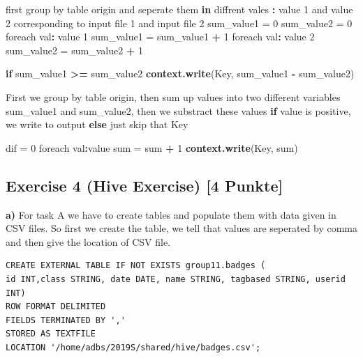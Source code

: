 \documentclass[]{article}
\newenvironment{Shaded}{\begin{snugshade}}{\end{snugshade}}
\newcommand{\ControlFlowTok}[1]{\textcolor[rgb]{0.13,0.29,0.53}{\textbf{#1}}}
\newcommand{\DecValTok}[1]{\textcolor[rgb]{0.00,0.00,0.81}{#1}}
\newcommand{\KeywordTok}[1]{\textcolor[rgb]{0.13,0.29,0.53}{\textbf{#1}}}
\newcommand{\NormalTok}[1]{#1}
\newcommand{\OperatorTok}[1]{\textcolor[rgb]{0.81,0.36,0.00}{\textbf{#1}}}
\newcommand{\StringTok}[1]{\textcolor[rgb]{0.31,0.60,0.02}{#1}}
\begin{document}
\begin{Shaded}
\begin{Highlighting}[]
\NormalTok{first group by table origin and seperate them }\ControlFlowTok{in}\NormalTok{ diffrent vales }\OperatorTok{:}\StringTok{ }\NormalTok{value }\DecValTok{1}\NormalTok{ and }
\NormalTok{value }\DecValTok{2}\NormalTok{ corresponding to input file }\DecValTok{1}\NormalTok{ and input file }\DecValTok{2}
\NormalTok{sum_value1 =}\StringTok{ }\DecValTok{0}
\NormalTok{sum_value2 =}\StringTok{ }\DecValTok{0}
\NormalTok{foreach val}\OperatorTok{:}\StringTok{ }\NormalTok{value }\DecValTok{1}
\NormalTok{    sum_value1 =}\StringTok{ }\NormalTok{sum_value1 }\OperatorTok{+}\StringTok{ }\DecValTok{1}
\NormalTok{foreach val}\OperatorTok{:}\StringTok{ }\NormalTok{value }\DecValTok{2}
\NormalTok{    sum_value2 =}\StringTok{ }\NormalTok{sum_value2 }\OperatorTok{+}\StringTok{ }\DecValTok{1}

\ControlFlowTok{if}\NormalTok{ sum_value1 }\OperatorTok{>=}\StringTok{ }\NormalTok{sum_value2}
    \KeywordTok{context.write}\NormalTok{(Key, sum_value1 }\OperatorTok{-}\StringTok{ }\NormalTok{sum_value2)}
    
\NormalTok{First we group by table origin, then sum up values into two different variables sum_value1}
\NormalTok{and sum_value2, then we substract these values }\ControlFlowTok{if}\NormalTok{ value is positive, }
\NormalTok{we write to output }\ControlFlowTok{else}\NormalTok{ just skip that Key}

\NormalTok{dif =}\StringTok{ }\DecValTok{0}
\NormalTok{foreach val}\OperatorTok{:}\NormalTok{value }
\NormalTok{    sum =}\StringTok{ }\NormalTok{sum }\OperatorTok{+}\StringTok{ }\DecValTok{1}
\KeywordTok{context.write}\NormalTok{(Key, sum)}
\end{Highlighting}
\end{Shaded}

\newpage

\hypertarget{exercise-4-hive-exercise-4-punkte}{%
\subsection{Exercise 4 (Hive Exercise) {[}4
Punkte{]}}\label{exercise-4-hive-exercise-4-punkte}}

\textbf{a)} For task A we have to create tables and populate them with
data given in CSV files. So first we create the table, we tell that
values are seperated by comma and then give the location of CSV file.

\begin{verbatim}
CREATE EXTERNAL TABLE IF NOT EXISTS group11.badges (
id INT,class STRING, date DATE, name STRING, tagbased STRING, userid INT)
ROW FORMAT DELIMITED
FIELDS TERMINATED BY ','
STORED AS TEXTFILE
LOCATION '/home/adbs/2019S/shared/hive/badges.csv';
\end{verbatim}
\end{document}
